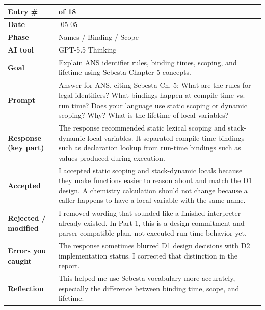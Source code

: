 \documentclass[11pt,a4paper]{article}
\newcommand{\entrygap}{\vspace{8pt}}
\newenvironment{journalentry}{%
  \begin{center}\small\renewcommand{\arraystretch}{1.22}%
  \begin{tabular}{|>{\columncolor{anscodebg}\bfseries}p{3.0cm}|>{\RaggedRight\arraybackslash}p{12.25cm}|}%
  \hline
}{%
  \end{tabular}\end{center}\entrygap
}
\begin{document}
\begin{journalentry}
Entry \# & 7 of 18 \\ \hline
Date & 2026-05-05 \\ \hline
Phase & Names / Binding / Scope \\ \hline
AI tool & GPT-5.5 Thinking \\ \hline
Goal & Explain ANS identifier rules, binding times, scoping, and lifetime using Sebesta Chapter 5 concepts. \\ \hline
Prompt & Answer for ANS, citing Sebesta Ch. 5: What are the rules for legal identifiers? What bindings happen at compile time vs. run time? Does your language use static scoping or dynamic scoping? Why? What is the lifetime of local variables? \\ \hline
Response (key part) & The response recommended static lexical scoping and stack-dynamic local variables. It separated compile-time bindings such as declaration lookup from run-time bindings such as values produced during execution. \\ \hline
Accepted & I accepted static scoping and stack-dynamic locals because they make functions easier to reason about and match the D1 design. A chemistry calculation should not change because a caller happens to have a local variable with the same name. \\ \hline
Rejected / modified & I removed wording that sounded like a finished interpreter already existed. In Part 1, this is a design commitment and parser-compatible plan, not executed run-time behavior yet. \\ \hline
Errors you caught & The response sometimes blurred D1 design decisions with D2 implementation status. I corrected that distinction in the report. \\ \hline
Reflection & This helped me use Sebesta vocabulary more accurately, especially the difference between binding time, scope, and lifetime. \\ \hline
\end{journalentry}
\end{document}
